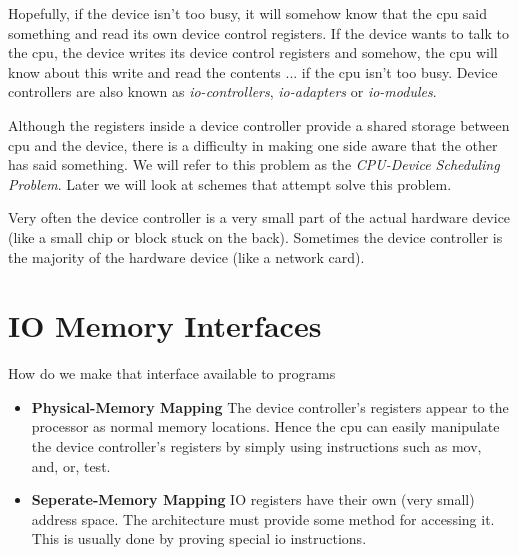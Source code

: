 Hopefully, if the device isn’t too busy, it will somehow know that the cpu said 
something and read its own device control registers. 
If the device wants to talk to the cpu, the device writes its device control registers 
and somehow, the cpu will know about this write and read the contents ... if the cpu isn’t too busy. 
Device controllers are also known as \textit{io-controllers}, 
\textit{io-adapters} or \textit{io-modules}. 

Although the registers inside a device controller provide a shared storage between cpu 
and the device, there is a difficulty in making one side aware that the other has said 
something. We will refer to this problem as the \textit{CPU-Device Scheduling Problem}. 
Later we will look at schemes that attempt solve this problem.

Very often the device controller is a very small part of the actual hardware device 
(like a small chip or block stuck on the back). 
Sometimes the device controller is the majority of the hardware device 
(like a network card).


\section{IO Memory Interfaces}

How do we make that interface available to programs

\begin{figure}[h]
\end{figure}


\begin{itemize}   
\renewcommand{\labelitemi}{$\Box$}
\item \textbf{Physical-Memory Mapping} 
The device controller’s registers appear to the processor as normal memory locations. 
Hence the cpu can easily manipulate the device controller’s registers by simply 
using instructions such as mov, and, or, test.
\item \textbf{Seperate-Memory Mapping} 
IO registers have their own (very small) address space. 
The architecture must provide some method for accessing it. 
This is usually done by proving special io instructions.
\end{itemize}

